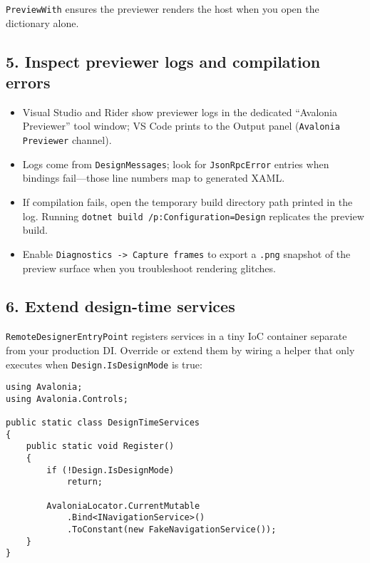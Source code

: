\passthrough{\lstinline!PreviewWith!} ensures the previewer renders the
host when you open the dictionary alone.

\subsection{5. Inspect previewer logs and compilation
errors}\label{inspect-previewer-logs-and-compilation-errors}

\begin{itemize}
\tightlist
\item
  Visual Studio and Rider show previewer logs in the dedicated
  ``Avalonia Previewer'' tool window; VS Code prints to the Output panel
  (\passthrough{\lstinline!Avalonia Previewer!} channel).
\item
  Logs come from \passthrough{\lstinline!DesignMessages!}; look for
  \passthrough{\lstinline!JsonRpcError!} entries when bindings
  fail---those line numbers map to generated XAML.
\item
  If compilation fails, open the temporary build directory path printed
  in the log. Running
  \passthrough{\lstinline!dotnet build /p:Configuration=Design!}
  replicates the preview build.
\item
  Enable \passthrough{\lstinline!Diagnostics -> Capture frames!} to
  export a \passthrough{\lstinline!.png!} snapshot of the preview
  surface when you troubleshoot rendering glitches.
\end{itemize}

\subsection{6. Extend design-time
services}\label{extend-design-time-services}

\passthrough{\lstinline!RemoteDesignerEntryPoint!} registers services in
a tiny IoC container separate from your production DI. Override or
extend them by wiring a helper that only executes when
\passthrough{\lstinline!Design.IsDesignMode!} is true:

\begin{lstlisting}
using Avalonia;
using Avalonia.Controls;

public static class DesignTimeServices
{
    public static void Register()
    {
        if (!Design.IsDesignMode)
            return;

        AvaloniaLocator.CurrentMutable
            .Bind<INavigationService>()
            .ToConstant(new FakeNavigationService());
    }
}
\end{lstlisting}

